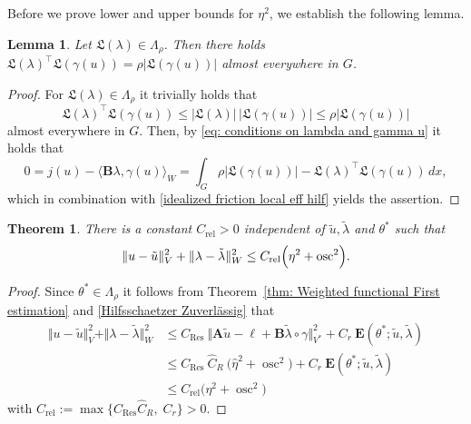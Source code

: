 \documentclass[12pt,twoside,reqno]{amsart}
\newtheorem{theorem}{Theorem}[section]
\newtheorem{lemma}{Lemma}[section]
\theoremstyle{definition}
\numberwithin{equation}{section}
\renewcommand{\L}{\mathfrak{L}}
\newcommand{\B} {\bm{B}}
\newcommand{\norm}[1]    {\Vert #1 \Vert}
\begin{document}
    Before we prove lower and upper bounds for $\eta^2$, we establish the following lemma.
  \begin{lemma}\label{lem: Friction local eff preliminary}
  Let $\L(\lambda) \in \Lambda_\rho $. Then there holds  $\L(\lambda)^\top \L(\gamma(u)) =\rho |\L(\gamma(u))|$ almost everywhere in $G$.
   \end{lemma}
  \begin{proof}
     For $\L(\lambda)\in \Lambda_\rho$ it trivially holds that
  \begin{equation}\label{idealized friction local eff hilf}
       \L(\lambda)^\top \L(\gamma(u)) \leq |\L(\lambda)| \, |\L(\gamma(u))| \leq \rho |\L(\gamma(u))|
  \end{equation}
  almost everywhere in $G$. Then, by \eqref{eq: conditions on lambda and gamma u} it holds that
  \begin{equation*}
       0=j(u)- \langle \B \lambda,\gamma(u)\rangle_W = \int_G \rho |\L(\gamma(u))|- \L(\lambda)^\top \L(\gamma(u))\,dx,
 \end{equation*}
  which in combination with \eqref{idealized friction local eff hilf} yields the assertion.
 \end{proof}
  
    
    \begin{theorem}\label{Vorstufe Rel und Eff}
        There is a constant $C_{\text{rel}}>0$ independent of $\tilde{u},\tilde{\lambda}$ and $\theta^*$ such that
        \begin{equation*}
            \norm{u-\tilde{u}}_V^2+\norm{{\lambda}-\tilde{\lambda}}_{W}^2 \leq C_{\text{rel}}\Bigl(\eta^2+\operatorname{osc}^2\Bigr).
        \end{equation*}
    \end{theorem}
 \begin{proof}
        Since $\theta^*\in \Lambda_\rho$ it follows from Theorem~\ref{thm: Weighted functional First estimation} and \eqref{Hilfsschaetzer Zuverlässig} that
        \begin{align*}
            \norm{u-\tilde{u}}_V^2+\norm{{\lambda}-\tilde{\lambda}}_{W}^2 & \leq C_{\text{Res}}\:\norm{\bm{A}\tilde{u}-\bm{\ell}+\B\tilde{\lambda}\circ\gamma}_{V^*}^2+C_r\:\bm{E}(\theta^*;\tilde{u},\tilde{\lambda}) \\
            & \leq  C_{\text{Res}}\:\widehat{C}_R\:\big(\hat{\eta}^2+\operatorname{osc}^2\big)+C_r\:\bm{E}(\theta^*;\tilde{u},\tilde{\lambda}) \\
            & \leq C_{\text{rel}}\Big(\eta^2+\operatorname{osc}^2\Big)
        \end{align*}
        with $C_{\text{rel}}:= \max\{C_{\text{Res}}\widehat{C}_R, \;C_r\}>0$.
    \end{proof}
    
\end{document}
